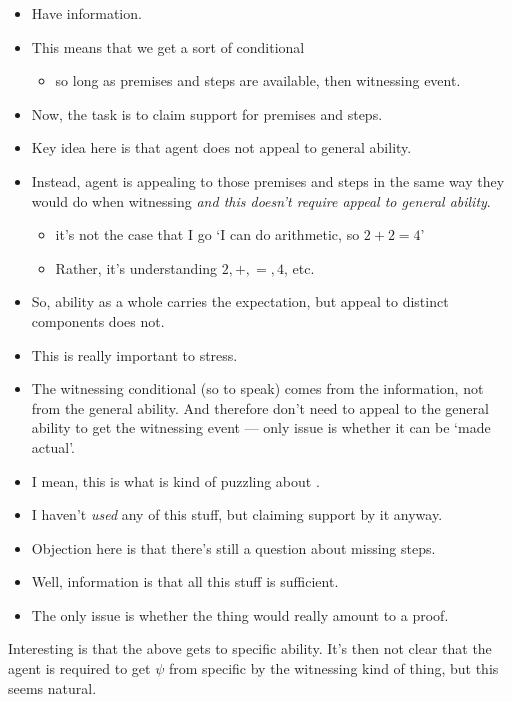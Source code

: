 \begin{note}
  \large
  \begin{itemize}
  \item Have \gsi{} information.
  \item This means that we get a sort of conditional
    \begin{itemize}
    \item so long as premises and steps are available, then witnessing event.
    \end{itemize}
  \item Now, the task is to claim support for premises and steps.
  \item Key idea here is that agent does not appeal to general ability.
  \item Instead, agent is appealing to those premises and steps in the same way they would do when witnessing \emph{and this doesn't require appeal to general ability}.
    \begin{itemize}
    \item it's not the case that I go `I can do arithmetic, so \(2 + 2 = 4\)'
    \item Rather, it's understanding \(2,+,=,4\), etc.
    \end{itemize}
  \item So, ability as a whole carries the expectation, but appeal to distinct components does not.
  \item This is really important to stress.
  \item The witnessing conditional (so to speak) comes from the information, not from the general ability.
    And therefore don't need to appeal to the general ability to get the witnessing event --- only issue is whether it can be `made actual'.
  \item I mean, this is what is kind of puzzling about \EAS{}.
  \item I haven't \emph{used} any of this stuff, but claiming support by it anyway.
  \end{itemize}

  \begin{itemize}
  \item Objection here is that there's still a question about missing steps.
  \item Well, information is that all this stuff is sufficient.
  \item The only issue is whether the thing would really amount to a proof.
  \end{itemize}

  \begin{note}
    Interesting is that the above gets to specific ability.
    It's then not clear that the agent is required to get \(\psi\) from specific by the witnessing kind of thing, but this seems natural.
  \end{note}
\end{note}

